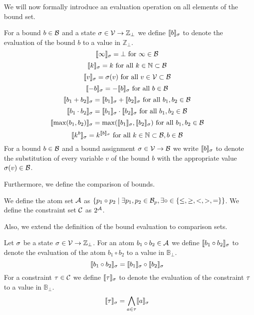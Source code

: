
We will now formally introduce an evaluation operation on all elements of the bound set.

\begin{definition}
  For a bound $b \in \mathcal{B}$ and a state $\sigma \in \mathcal{V} \rightarrow \mathbb{Z}_\bot$ we define $\llbracket b \rrbracket_{\sigma}$ to denote the evaluation of the bound $b$ to a value in $\mathbb{Z}_\bot$.
  \[ \llbracket \infty \rrbracket_{\sigma} = \bot \text{ for } \infty \in \mathcal{B} \] 
  \[ \llbracket k \rrbracket_{\sigma} = k \text{ for all } k \in \mathbb{N} \subset \mathcal{B} \] 
  \[ \llbracket v \rrbracket_{\sigma} = \sigma(v) \text{ for all } v \in \mathcal{V} \subset \mathcal{B} \] 
  \[ \llbracket -b \rrbracket_{\sigma} = -\llbracket b \rrbracket_{\sigma} \text{ for all } b \in \mathcal{B} \] 
  \[ \llbracket b_1 + b_2 \rrbracket_{\sigma} = \llbracket b_1 \rrbracket_{\sigma} + \llbracket b_2 \rrbracket_{\sigma} \text{ for all } b_1, b_2 \in \mathcal{B} \] 
  \[ \llbracket b_1 \cdot b_2 \rrbracket_{\sigma} = \llbracket b_1 \rrbracket_{\sigma} \cdot \llbracket b_2 \rrbracket_{\sigma} \text{ for all } b_1, b_2 \in \mathcal{B} \] 
  \[ \llbracket \max(b_1, b_2) \rrbracket_{\sigma} = \max(\llbracket b_1 \rrbracket_{\sigma}, \llbracket b_2 \rrbracket_{\sigma}) \text{ for all } b_1, b_2 \in \mathcal{B} \]
  \[ \llbracket k^b \rrbracket_{\sigma} = k^{\llbracket b \rrbracket_{\sigma}} \text{ for all } k \in \mathbb{N} \subset \mathcal{B}, b \in \mathcal{B} \]  
  For a bound $b \in \mathcal{B}$ and a bound assignment $\sigma \in \mathcal{V} \rightarrow \mathcal{B}$ we write $\llbracket b \rrbracket_{\sigma}$ to denote the substitution of every variable $v$ of the bound $b$ with the appropriate value $\sigma(v) \in \mathcal{B}$.
\end{definition}
Furthermore, we define the comparison of bounds.

\begin{definition}
  We define the atom set $\mathcal{A}$ as $\lbrace p_1 \circ p_2 \mid \exists p_1, p_2 \in \mathcal{B}_p, \exists \circ \in \lbrace \leq, \geq, <, >, = \rbrace \rbrace$.
  We define the constraint set $\mathcal{C}$ as $2^{\mathcal{A}}$.
\end{definition}
Also, we extend the definition of the bound evaluation to comparison sets.

\begin{definition}
  Let $\sigma$ be a state $\sigma \in \mathcal{V} \rightarrow \mathbb{Z}_\bot$.
  For an atom $b_1 \circ b_2 \in \mathcal{A}$ we define $\llbracket b_1 \circ b_2 \rrbracket_{\sigma}$ to denote the evaluation of the atom $b_1 \circ b_2$ to a value in $\mathbb{B}_\bot$.
  \[ \llbracket b_1 \circ b_2 \rrbracket_{\sigma} = \llbracket b_1 \rrbracket_{\sigma} \circ \llbracket b_2 \rrbracket_{\sigma} \]
  For a constraint $\tau \in \mathcal{C}$ we define $\llbracket \tau \rrbracket_{\sigma}$ to denote the evaluation of the constraint $\tau$ to a value in $\mathbb{B}_\bot$.
  \[ \llbracket \tau \rrbracket_{\sigma} = \bigwedge_{a \in \tau} \llbracket a \rrbracket_{\sigma} \]
\end{definition}
